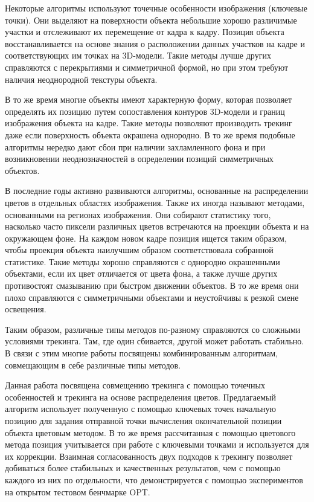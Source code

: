 Некоторые алгоритмы\cite{Vacchetti2004,Lourakis2013,Pauwels2013}
используют точечные особенности изображения (ключевые точки).
Они выделяют на поверхности объекта небольшие хорошо различимые
участки\cite{AKAZE,SIFT,ShiAndTomasi} и отслеживают их перемещение от кадра
к кадру\cite{TomasiAndKanade,SIFT,PyrLK}.
Позиция объекта восстанавливается на основе знания о расположении данных
участков на кадре и соответствующих им точках на 3D-модели\cite{EPnP}.
Такие методы лучше других справляются с перекрытиями и симметричной формой,
но при этом требуют наличия неоднородной текстуры объекта.

В то же время многие объекты имеют характерную форму, которая позволяет
определять их позицию путем сопоставления контуров 3D-модели
и границ\cite{EdgesSurvey,CANNY} изображения объекта на кадре.
Такие методы\cite{RAPID,Marchand2003,Choi2012,Marchand2006,Klein2006,SeoHinterstoisser2014,WangZhong2015,Damen2012,VacchettiEdges2004}
позволяют производить трекинг даже если поверхность объекта окрашена однородно.
В то же время подобные алгоритмы нередко дают сбои при наличии захламленного
фона и при возникновении неоднозначностей в определении позиций
симметричных объектов.

В последние годы активно развиваются алгоритмы, основанные на
распределении цветов в отдельных областях
изображения\cite{PWP3D,Tjaden2017,Tjaden2018}.
Также их иногда называют методами, основанными на регионах изображения.
Они собирают статистику того, насколько часто пиксели различных цветов
встречаются на проекции объекта и на окружающем фоне.
На каждом новом кадре позиция ищется таким образом, чтобы проекция объекта
наилучшим образом соответствовала собранной статистике.
Такие методы хорошо справляются с однородно окрашенными объектами, если их цвет
отличается от цвета фона, а также лучше других противостоят смазыванию при
быстром движении объектов.
В то же время они плохо справляются с симметричными объектами и неустойчивы к
резкой смене освещения.

Таким образом, различные типы методов по-разному справляются со сложными
условиями трекинга.
Там, где один сбивается, другой может работать стабильно.  В связи с этим
многие работы\cite{RegionPhotometric,ColorFeature2018,Bugaev_2018_ECCV}
посвящены комбинированным алгоритмам, совмещающим в себе различные типы
методов.


Данная работа посвящена совмещению трекинга с помощью точечных особенностей и
трекинга на основе распределения цветов.
Предлагаемый алгоритм использует полученную с помощью ключевых точек начальную
позицию для задания отправной точки вычисления окончательной позиции объекта
цветовым методом.
В то же время рассчитанная с помощью цветового метода позиция учитывается при
работе с ключевыми точками и используется для их коррекции.
Взаимная согласованность двух подходов к трекингу позволяет добиваться более
стабильных и качественных результатов, чем с помощью каждого из них по
отдельности, что демонстрируется с помощью экспериментов на открытом тестовом
бенчмарке OPT\cite{OPT}.

